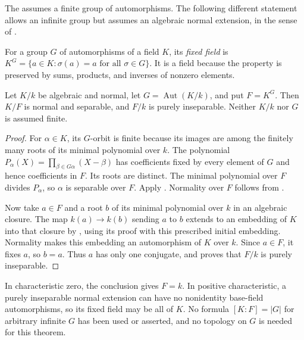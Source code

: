 The  assumes a finite group of
automorphisms. The following different statement allows an infinite
group but assumes an algebraic normal extension, in the sense of
.

\begin{definition}\label{automorphism-fixed-field}
For a group $G$ of automorphisms of a field $K$, its \emph{fixed field}
is $K^G=\{a\in K:\sigma(a)=a\text{ for all }\sigma\in G\}$.
It is a field because the property is preserved by sums, products,
and inverses of nonzero elements.
\end{definition}
\begin{theorem}\label{normal-fixed-fields}
Let $K/k$ be algebraic and normal, let $G=\operatorname{Aut}(K/k)$,
and put $F=K^G$. Then $K/F$ is normal and separable, and $F/k$ is
purely inseparable. Neither $K/k$ nor $G$ is assumed finite.
\end{theorem}
\begin{proof}\label{normal-fixed-fields-proof}
For $\alpha\in K$, its $G$-orbit is finite because its images are
among the finitely many roots of its minimal polynomial over $k$.
The polynomial $P_\alpha(X)=\prod_{\beta\in G\alpha}(X-\beta)$ has
coefficients fixed by every element of $G$ and hence coefficients in
$F$. Its roots are distinct. The minimal polynomial over $F$ divides
$P_\alpha$, so $\alpha$ is separable over $F$. Apply
. Normality over $F$ follows from
.

Now take $a\in F$ and a root $b$ of its minimal polynomial over $k$
in an algebraic closure. The map $k(a)\to k(b)$ sending $a$ to $b$
extends to an embedding of $K$ into that closure by
, using its proof with this
prescribed initial embedding. Normality makes this embedding an
automorphism of $K$ over $k$. Since $a\in F$, it fixes $a$, so $b=a$.
Thus $a$ has only one conjugate, and
 proves that $F/k$ is purely inseparable.
\end{proof}
\begin{remark}\label{fixed-fields-scope}
In characteristic zero, the conclusion gives $F=k$. In positive
characteristic, a purely inseparable normal extension can have no
nonidentity base-field automorphisms, so its fixed field may be all
of $K$. No formula $[K:F]=|G|$ for arbitrary infinite $G$ has been
used or asserted, and no topology on $G$ is needed for this theorem.
\end{remark}
